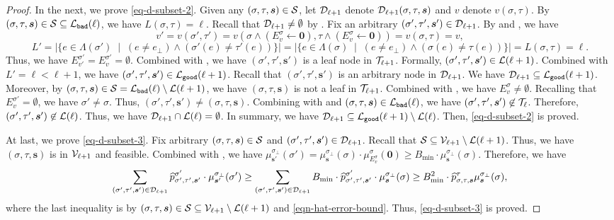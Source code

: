 \documentclass[11pt]{article}
\newcommand{\abs}[1]{\left\vert#1\right\vert}
\renewcommand{\mid}{\;\middle\vert\;} \newcommand{\cmid}{\,:\,}
\def\!#1{\mathtt{#1}}
\newcommand{\zero}{\boldsymbol{0}}
\newcommand{\seqS}{\boldsymbol{s}}
\begin{document}
\begin{proof}
In the next, we prove \eqref{eq-d-subset-2}.
Given any $(\sigma,\tau,\seqS)\in \+S$, let $\mathcal{D}_{\ell+1}$ denote 
$\+D_{\ell+1}(\sigma,\tau,\seqS)$ and $v$ denote $v(\sigma,\tau)$.
By $(\sigma,\tau,\seqS)\in \+S \subseteq \+L_{\!{bad}}(\ell)$,
we have $L(\sigma,\tau) = \ell$. Recall that $\mathcal{D}_{\ell+1}\neq \emptyset$ by .
Fix an arbitrary $(\sigma',\tau',\seqS')\in \+D_{\ell+1}$.
By  and ,
we have 
\[v' = v(\sigma',\tau')= v(\sigma \land (E^{\sigma}_v \gets \boldsymbol{0}),\tau \land (E^{\sigma}_v \gets \boldsymbol{0}))=v(\sigma,\tau)=v,\]
\[L' = \abs{\{e\in \Lambda(\sigma')\mid (e\neq e_{\bot})\land (\sigma'(e)\neq \tau'(e))\}} = \abs{\{e\in \Lambda(\sigma)\mid (e\neq e_{\bot})\land (\sigma(e)\neq \tau(e))\}} = L(\sigma,\tau) = \ell.\]
Thus, we have
$E^{\sigma'}_{v'} =E^{\sigma'}_{v} = \emptyset$.
Combined with ,
we have  $(\sigma',\tau',\seqS')$ is a leaf node in $\mathcal{T}_{\ell+1}$.
Formally, $(\sigma',\tau',\seqS')\in \+L(\ell+1)$.
Combined with $L'=\ell<\ell+1$, we have 
$(\sigma',\tau',\seqS') \in \+L_{\!{good}}(\ell+1)$.
Recall that $(\sigma',\tau',\seqS')$ is an arbitrary node in $\mathcal{D}_{\ell+1}$.
We have $\+D_{\ell+1}\subseteq \+L_{\!{good}}(\ell+1)$.
Moreover, by $(\sigma,\tau,\seqS)\in 
\+S = \+L_{\!{bad}}(\ell)\setminus \+L(\ell+1)$,
we have $(\sigma,\tau,\seqS)$ is not a leaf in $\mathcal{T}_{\ell+1}$.
Combined with , we have 
$E^{\sigma}_{v} \neq \emptyset$.
Recalling that $E^{\sigma'}_{v} = \emptyset$,
we have $\sigma'\neq \sigma$.
Thus, $(\sigma',\tau',\seqS') \neq (\sigma,\tau,\seqS)$.
Combining with  and $(\sigma,\tau,\seqS)\in \+L_{\!{bad}}(\ell)$,
we have $(\sigma',\tau',\seqS')\not \in \+T_{\ell}$.
Therefore, $(\sigma',\tau',\seqS')\not\in  \+L(\ell)$.
Thus, we have $\mathcal{D}_{\ell+1}\cap \mathcal{L}(\ell) = \emptyset$.
In summary, we have
$\+D_{\ell+1}\subseteq \+L_{\!{good}}(\ell+1)\setminus \+L(\ell)$.
Then, \eqref{eq-d-subset-2} is proved.

At last, we prove \eqref{eq-d-subset-3}.
Fix arbitrary $(\sigma,\tau,\seqS) \in \+S$ and  $(\sigma',\tau',\seqS')\in \+D_{\ell+1}$. 
Recall that $\mathcal{S} \subseteq  \mathcal{V}_{\ell+1}\setminus \mathcal{L}(\ell+1)$.
Thus, we have $(\sigma,\tau,\seqS)$ is in $\mathcal{V}_{\ell+1}$ and feasible.
Combined with ,
we have 
$\mu^{\sigma_{\bot}}_{\seqS'}(\sigma') = \mu^{\sigma_{\bot}}_{\seqS}(\sigma)\cdot \mu_{E_v^\sigma}^{\sigma}(\zero) \ge B_{\min}\cdot\mu^{\sigma_{\bot}}_{\seqS}(\sigma)$.
Therefore, we have 
\begin{align*}
\sum_{(\sigma',\tau',\seqS')\in \+D_{\ell+1}} \widehat{p}^{\sigma'}_{\sigma',\tau',\seqS'}\cdot \mu^{\sigma_{\bot}}_{\seqS'}(\sigma') 
\geq \sum_{(\sigma',\tau',\seqS')\in \+D_{\ell+1}} B_{\min}\cdot\widehat{p}^{\sigma'}_{\sigma',\tau',\seqS'}\cdot \mu^{\sigma_{\bot}}_{\seqS}(\sigma) \geq B_{\min}^2 \cdot \widehat{p}^{\tau}_{\sigma,\tau,\seqS}\mu^{\sigma_{\bot}}_{\seqS}(\sigma),
\end{align*}
where the last inequality is by $(\sigma,\tau,\seqS) \in \+S\subseteq  \+V_{\ell+1}\setminus \+L(\ell+1)$ and \eqref{eqn-hat-error-bound}. Thus, \eqref{eq-d-subset-3} is proved.


\end{proof}
\end{document}

